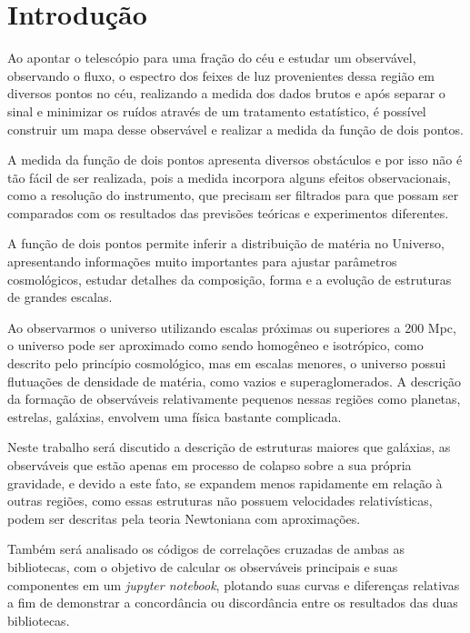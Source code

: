 	\chapter*{Introdução}

 Ao apontar o telescópio para uma fração do céu e estudar um observável, observando o fluxo, o espectro dos feixes de luz provenientes dessa região em diversos pontos no céu, realizando a medida dos dados brutos e após separar o sinal e minimizar os ruídos através de um tratamento estatístico, é possível construir um mapa desse observável e realizar a medida da função de dois pontos.
 
 A medida da função de dois pontos apresenta diversos obstáculos e por isso não é tão fácil de ser realizada, pois a medida incorpora alguns efeitos observacionais, como a resolução do instrumento, que precisam ser filtrados para que possam ser comparados com os resultados das previsões teóricas e experimentos diferentes. 

A função de dois pontos permite inferir a distribuição de matéria no Universo, apresentando informações muito importantes para ajustar parâmetros cosmológicos, estudar detalhes da composição, forma e a evolução de estruturas de grandes escalas.

Ao observarmos o universo utilizando escalas próximas ou superiores a 200 Mpc, o universo pode ser aproximado como sendo homogêneo e isotrópico, como descrito pelo princípio cosmológico, mas em escalas menores, o universo possui flutuações de densidade de matéria, como vazios e superaglomerados. A descrição da formação de observáveis relativamente pequenos nessas regiões como planetas, estrelas, galáxias, envolvem uma física bastante complicada.

Neste trabalho será discutido a descrição de estruturas maiores que galáxias, as observáveis que estão apenas em processo de colapso sobre a sua própria gravidade, e devido a este fato, se expandem menos rapidamente em relação à outras regiões, como essas estruturas não possuem velocidades relativísticas, podem ser descritas pela teoria Newtoniana com aproximações.

Também será analisado os códigos de correlações cruzadas de ambas as bibliotecas, com  o objetivo de calcular os observáveis principais e suas componentes em um \textit{jupyter notebook}, plotando suas curvas e diferenças relativas a fim de demonstrar a concordância ou discordância entre os resultados das duas bibliotecas.





		